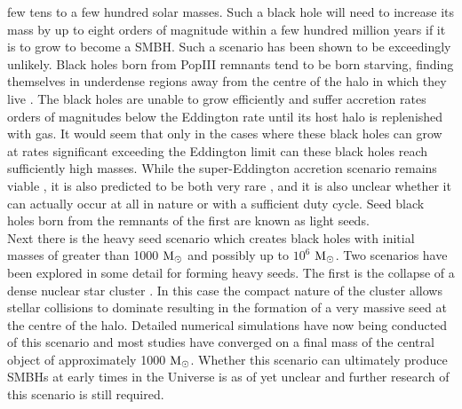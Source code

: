 \documentclass[graphics, twocolumn, usenatbib]{mn2e}
\newcommand{\msolar} {$\rm{M_{\odot}}~$}
\newcommand{\msolarc} {$\rm{M_{\odot}}$}
\begin{document}
few tens to a few hundred solar masses. Such a black hole will need to increase its mass by up to
eight orders of magnitude within a few hundred million years if it is to grow to become a SMBH. Such
a scenario has been shown to be exceedingly unlikely. Black holes born from PopIII remnants tend to
be born starving, finding themselves in underdense regions away from the centre of the halo in
which they live \citep{Whalen_2004, Milosavljevic_2009, Alvarez_2009, Smith_2018}. The black holes
are unable to grow efficiently and suffer accretion rates orders of magnitudes below the Eddington
rate until its host halo is replenished with gas. It would seem that only in the cases where these 
black holes can grow at rates significant
exceeding the Eddington limit can these black holes reach sufficiently high masses. While the
super-Eddington accretion scenario remains viable \citep{Madau_2001, Madau_2014, Alexander_2014,
  Lupi_2016}, it is also predicted to be both very rare \citep{Pacucci_2017}, and it is also unclear
whether it can actually occur at all in nature or with a sufficient duty cycle. Seed black holes born
from the remnants of the first are known as light seeds.\\
\indent Next there is the heavy seed scenario which creates black holes with initial masses of
greater than 1000 \msolar and possibly up to $10^{6}$ \msolarc. Two scenarios have been
explored in some detail for forming heavy seeds. The first is the collapse of a dense
nuclear star cluster \citep{PortegiesZwart_2004, Freitag_2008, Devecchi_2008, Merritt_2008,
  Davies_2011, Lupi_2014}. In this case the compact nature of the cluster allows
stellar collisions to dominate resulting in the formation of a very massive seed at the
centre of the halo. Detailed numerical simulations have now being conducted \cite[e.g.][]{Katz_2015,
  Reinoso_2018} of this scenario and
most studies have converged on a final mass of the central object of approximately 1000 \msolarc.
Whether this scenario can ultimately produce SMBHs at early times in the Universe is as of yet
unclear and further research of this scenario is still required. \\
\end{document}
